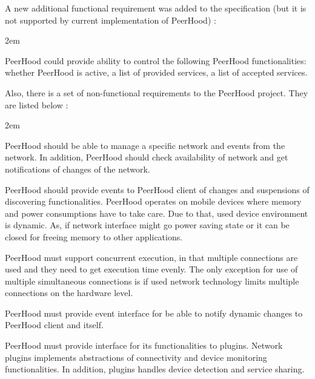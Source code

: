 %
A new additional functional requirement was added to the specification (but it is not supported by current implementation of PeerHood) : 
\begin{description}
	\leftskip2em%
	\setlength{\itemsep}{0pt}%
	\setlength{\parsep}{0pt}%
	
	\item[User control] PeerHood could provide ability to control the following PeerHood functionalities: whether PeerHood is active, a list of provided services, a list of accepted services.
\end{description}

%
Also, there is a set of non-functional requirements to the PeerHood project. 
%
They are listed below : 
\begin{description}
	\leftskip2em%
	\setlength{\itemsep}{0pt}%
	\setlength{\parsep}{0pt}%
	
	\item[Network management] PeerHood should be able to manage a specific network and events from the network. 
	In addition, PeerHood should check availability of network and get notifications of changes of the network.

	\item[Component management] PeerHood should provide events to PeerHood client of changes and suspensions of discovering functionalities. 
	PeerHood operates on mobile devices where memory and power consumptions have to take care. 
	Due to that, used device environment is dynamic. 
	As, if network interface might go power saving state or it can be closed for freeing memory to other applications.

	\item[Communication concurrency base] PeerHood must support concurrent execution, in that multiple connections are used and they need to get execution time evenly. 
	The only exception for use of multiple simultaneous connections is if used network technology limits multiple connections on the hardware level.

	\item[Event interface] PeerHood must provide event interface for be able to notify dynamic changes to PeerHood client and itself.

	\item[Plugin architecture for networks] PeerHood must provide interface for its functionalities to plugins. 
	Network plugins implements abstractions of connectivity and device monitoring functionalities. 
	In addition, plugins handles device detection and service sharing.
\end{description}

